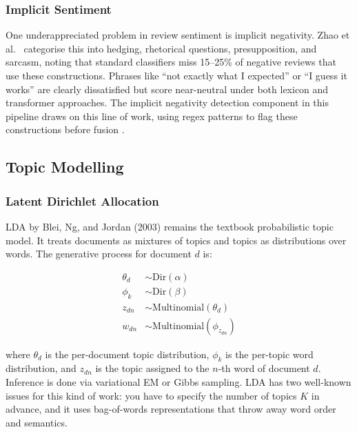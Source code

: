 \subsubsection{Implicit Sentiment}
\begin{justify}
One underappreciated problem in review sentiment is implicit negativity. Zhao et al.\ \cite{zhao2023implicit} categorise this into hedging, rhetorical questions, presupposition, and sarcasm, noting that standard classifiers miss 15--25\% of negative reviews that use these constructions. Phrases like ``not exactly what I expected'' or ``I guess it works'' are clearly dissatisfied but score near-neutral under both lexicon and transformer approaches. The implicit negativity detection component in this pipeline draws on this line of work, using regex patterns to flag these constructions before fusion \cite{hancock2007deception}.
\end{justify}

\subsection{Topic Modelling}

\subsubsection{Latent Dirichlet Allocation}
\begin{justify}
LDA \cite{blei2003latent} by Blei, Ng, and Jordan (2003) remains the textbook probabilistic topic model. It treats documents as mixtures of topics and topics as distributions over words. The generative process for document $d$ is:

\begin{align}
    \theta_d &\sim \text{Dir}(\alpha) \\
    \phi_k   &\sim \text{Dir}(\beta) \\
    z_{dn}   &\sim \text{Multinomial}(\theta_d) \\
    w_{dn}   &\sim \text{Multinomial}(\phi_{z_{dn}})
\end{align}

where $\theta_d$ is the per-document topic distribution, $\phi_k$ is the per-topic word distribution, and $z_{dn}$ is the topic assigned to the $n$-th word of document $d$. Inference is done via variational EM or Gibbs sampling. LDA has two well-known issues for this kind of work: you have to specify the number of topics $K$ in advance, and it uses bag-of-words representations that throw away word order and semantics.
\end{justify}

